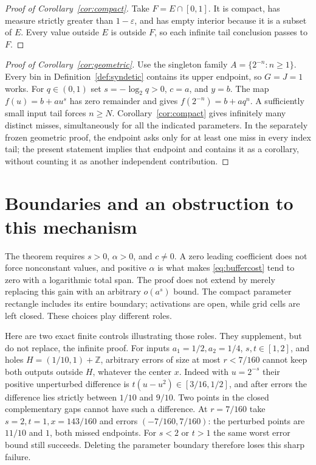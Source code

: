 \documentclass[11pt]{article}
\theoremstyle{definition}
\theoremstyle{remark}
\newcommand{\Z}{\mathbb Z}
\begin{document}
\begin{proof}[Proof of Corollary~\ref{cor:compact}]
Take $F=E\cap[0,1]$. It is compact, has measure strictly greater than
$1-\varepsilon$, and has empty interior because it is a subset of $E$.
Every value outside $E$ is outside $F$, so each infinite tail conclusion
passes to $F$.
\end{proof}

\begin{proof}[Proof of Corollary~\ref{cor:geometric}]
Use the singleton family $A=\{2^{-n}:n\geq1\}$. Every bin in
Definition~\ref{def:syndetic} contains its upper endpoint, so $G=J=1$ works.
For $q\in(0,1)$ set $s=-\log_2q>0$, $c=a$, and $y=b$.
The map $f(u)=b+au^s$ has zero remainder and gives
$f(2^{-n})=b+a q^n$. A sufficiently small input tail forces $n\geq N$.
Corollary~\ref{cor:compact} gives infinitely many distinct misses, simultaneously
for all the indicated parameters. In the separately frozen geometric proof,
the endpoint asks only for at least one miss in every index tail; the present
statement implies that endpoint and contains it as a corollary, without
counting it as another independent contribution.
\end{proof}

\section{Boundaries and an obstruction to this mechanism}\label{sec:scope}
The theorem requires $s>0$, $\alpha>0$, and $c\ne0$. A zero leading coefficient
does not force nonconstant values, and positive $\alpha$ is what makes
\eqref{eq:buffercost} tend to zero with a logarithmic total span. The proof
does not extend by merely replacing this gain with an arbitrary $o(a^s)$
bound. The compact parameter rectangle includes its entire boundary; activations
are open, while grid cells are left closed. These choices play different roles.

Here are two exact finite controls illustrating those roles. They supplement,
but do not replace, the infinite proof.
For inputs $a_1=1/2,a_2=1/4$, $s,t\in[1,2]$, and holes
$H=(1/10,1)+\Z$, arbitrary errors of size at most $r<7/160$ cannot keep both
outputs outside $H$, whatever the center $x$. Indeed with $u=2^{-s}$ their
positive unperturbed difference is $t(u-u^2)\in[3/16,1/2]$, and after errors
the difference lies strictly between $1/10$ and $9/10$. Two points in the
closed complementary gaps cannot have such a difference. At $r=7/160$ take
$s=2,t=1,x=143/160$ and errors $(-7/160,7/160)$: the perturbed points are
$11/10$ and $1$, both missed endpoints. For $s<2$ or $t>1$ the same worst
error bound still succeeds. Deleting the parameter boundary therefore loses
this sharp failure.
\end{document}
